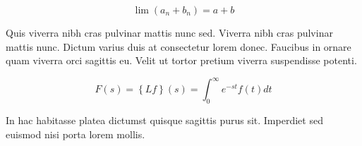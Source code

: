 \documentclass{article}
\begin{document}
    \begin{displaymath}
    	\lim\left ( a_n+b_n \right )=a+b
    \end{displaymath}
    
    Quis viverra nibh cras pulvinar mattis nunc sed. Viverra nibh cras pulvinar mattis nunc. Dictum varius duis at consectetur lorem donec. Faucibus in ornare quam viverra orci sagittis eu. Velit ut tortor pretium viverra suspendisse potenti.
    
    
    
    \begin{equation}
    F\left ( s \right )=\left \{ Lf \right \}\left ( s \right )= \int_{0}^{\infty } e^{-st}f\left ( t \right ) dt
    \end{equation}
    
    In hac habitasse platea dictumst quisque sagittis purus sit. Imperdiet sed euismod nisi porta lorem mollis. 
    
\end{document}
